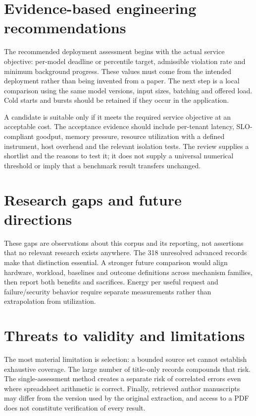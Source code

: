 \section{Evidence-based engineering recommendations}

The recommended deployment assessment begins with the actual service objective: per-model deadline or percentile target, admissible violation rate and minimum background progress. These values must come from the intended deployment rather than being invented from a paper. The next step is a local comparison using the same model versions, input sizes, batching and offered load. Cold starts and bursts should be retained if they occur in the application.

A candidate is suitable only if it meets the required service objective at an acceptable cost. The acceptance evidence should include per-tenant latency, SLO-compliant goodput, memory pressure, resource utilization with a defined instrument, host overhead and the relevant isolation tests. The review supplies a shortlist and the reasons to test it; it does not supply a universal numerical threshold or imply that a benchmark result transfers unchanged.

\section{Research gaps and future directions}

These gaps are observations about this corpus and its reporting, not assertions that no relevant research exists anywhere. The 318 unresolved advanced records make that distinction essential. A stronger future comparison would align hardware, workload, baselines and outcome definitions across mechanism families, then report both benefits and sacrifices. Energy per useful request and failure/security behavior require separate measurements rather than extrapolation from utilization.

\section{Threats to validity and limitations}

The most material limitation is selection: a bounded source set cannot establish exhaustive coverage. The large number of title-only records compounds that risk. The single-assessment method creates a separate risk of correlated errors even where spreadsheet arithmetic is correct. Finally, retrieved author manuscripts may differ from the version used by the original extraction, and access to a PDF does not constitute verification of every result.


